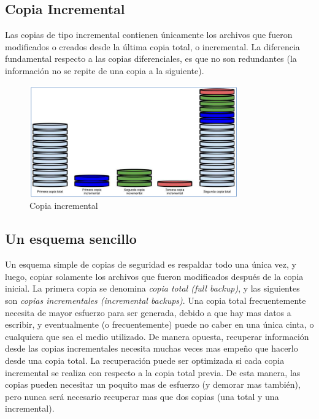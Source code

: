 \documentclass[12pt]{article}
\begin{document}
\subsection*{Copia Incremental}
Las copias de tipo incremental contienen únicamente los archivos que fueron
modificados o creados desde la última copia total, o incremental. La 
diferencia fundamental respecto a las copias diferenciales, es que no son 
redundantes (la información no se repite de una copia a la siguiente).


\begin{figure}[h]
\centering
\includegraphics[width=0.8\textwidth]{incremental.png}
\renewcommand{\figurename}{Fig.}
\caption{Copia incremental}
\label{contexto:figura}
\end{figure}

\subsection*{Un esquema sencillo}

Un esquema simple de copias de seguridad es respaldar todo una única vez, 
y luego, copiar solamente los archivos que fueron modificados después de 
la copia inicial. La primera copia se denomina \textit{copia total (full 
backup)}, y las siguientes son \textit{copias incrementales 
(incremental backups)}. Una copia total frecuentemente necesita de mayor 
esfuerzo para ser generada, debido a que hay mas datos a escribir,
y eventualmente (o frecuentemente) puede no caber en una única cinta, o 
cualquiera que sea el medio utilizado.
De manera opuesta, recuperar información desde las copias
incrementales necesita muchas veces mas empeño que hacerlo desde una copia 
total. La recuperación puede ser optimizada si cada copia incremental se 
realiza con respecto a la copia total previa. De esta manera, las copias 
pueden necesitar un poquito mas de esfuerzo (y demorar mas también), 
pero nunca será necesario recuperar mas que dos copias (una total y una 
incremental).
\end{document}
